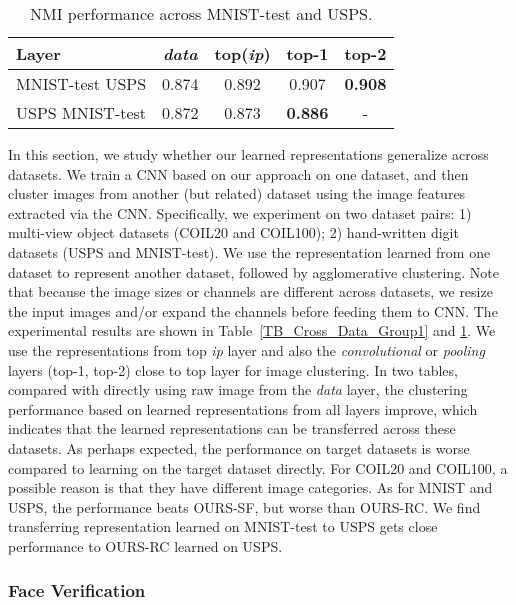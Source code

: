 \documentclass[10pt,twocolumn,letterpaper]{article}
\begin{document}
\begin{table}[!ht]
\caption{{NMI performance across MNIST-test and USPS.}}
\vspace{-15pt}
\center
\small
\begin{tabular}{lcccc}
  \toprule
  Layer  & \textit{data} & {top(\textit{ip})} & {top-1} & {top-2} \\   
  \midrule  
  MNIST-test  USPS   & 0.874 & 0.892 & 0.907 & \textbf{0.908} \\
  USPS  MNIST-test   & 0.872 & 0.873 & \textbf{0.886} & - \\  
  \bottomrule
\end{tabular}
\label{TB_Cross_Data_Group2}
\end{table}
{In this section, we study whether our learned representations generalize across datasets.} We train a CNN based on our approach on one dataset, and then cluster images from another (but related) dataset using the image features extracted via the CNN. Specifically, we experiment on two dataset pairs: 1) multi-view object datasets (COIL20 and COIL100); 2) hand-written digit datasets (USPS and MNIST-test). We use the representation learned from one dataset to represent another dataset, followed by agglomerative clustering. Note that because the image sizes or channels are different across datasets, we resize the input images {and/or expand the channels} before feeding them to CNN. The experimental results are shown in Table~\ref{TB_Cross_Data_Group1} and \ref{TB_Cross_Data_Group2}. {We use the representations from top \textit{ip} layer and also the \textit{convolutional} or \textit{pooling} layers (top-1, top-2) close to top layer for image clustering}. In two tables, compared with directly using raw image from the \textit{data} layer, the clustering performance based on learned representations from all layers improve, which indicates that the learned representations can be transferred across these datasets. {As perhaps expected}, the performance on target datasets {is worse compared to learning on the target dataset directly}. For COIL20 and COIL100, a possible reason is that they have different image categories. As for MNIST and USPS, the performance beats OURS-SF, but worse than OURS-RC. We find transferring representation learned on MNIST-test to USPS gets close performance to OURS-RC {learned on USPS}.

\subsubsection{Face Verification}
\end{document}
